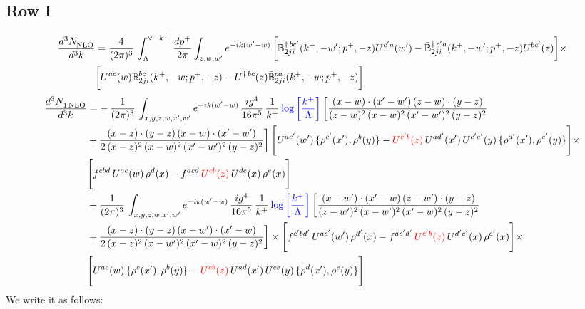 \documentclass[9pt]{article}
\def\mf#1{\mathbb{#1}}
\newcommand{\chg}[1]{{\color{red}#1}}
\numberwithin{equation}{section}
\begin{document}
\subsection{Row I}
\begin{align}
    \frac{d^{3}N_{\rm NLO}^{\rm}}{d^{3}k}  & = \frac{4}{(2\pi)^{3}}\,\int_{\Lambda}^{\vee-k^{+}}\, \frac{dp^{+}}{2\pi}\int_{z,w,w^{\prime}} e^{-ik(w^{\prime}-w)}\, \bigg[\mf{B}^{\dagger\, bc^{\prime}}_{2ji}(k^{+},-w^{\prime};p^{+},-z)U^{ c^{\prime}a}(w^{\prime}) -\Bar{\mf{B}}^{\dagger\, c^{\prime}a}_{2ji}(k^{+},-w^{\prime}; p^{+},-z)U^{bc^{\prime}}(z)\bigg]\times\notag \\ & \bigg[U^{ac}(w) \mf{B}^{bc}_{2ji}(k^{+},-w;p^{+},-z) -U^{\dagger\, bc}(z)\Bar{\mf{B}}^{ca}_{2ji}(k^{+},-w; p^{+},-z)\bigg]\nonumber
\end{align}
\begin{align}
 \frac{d^{3}N_{1\,\rm NLO}^{\rm}}{d^{3}k}  & =   -\, \frac{1}{(2\pi)^{3}}\,\int_{x,y,z,w,x',w^{\prime}} e^{-ik(w^{\prime}-w)}\,\frac{ig^{4}}{16\pi^{5}}\,\frac{1}{k^{+}}\,{\color{blue}\log{\left[\frac{k^{+}}{\Lambda}\right]}}\,\bigg[\frac{(x-w)\cdot (x'-w')\,(z-w)\cdot (y-z)}{(z-w)^{2}\,(x-w)^{2}\,(x'-w')^{2}\,(y-z)^{2}}\notag \\ & +\frac{(x-z)\cdot (y-z)\,(x-w)\cdot (x'-w')}{2\,(x-z)^{2}\, (x-w)^{2}\,(x'-w')^{2}\,(y-z)^{2}}\bigg]\, \Bigg[U^{ac'}(w')\,\{\rho^{c'}(x'),\rho^{b}(y)\}-\chg{U^{c'b}(z)}\,U^{ad'}(x')\,U^{c'e'}(y)\, \{\rho^{d'}(x'),\rho^{e'}(y)\}\Bigg]\times \notag \\ & \Bigg[f^{cbd}\,U^{ac}(w)\,\rho^{d}(x)-f^{acd}\, \chg{U^{cb}(z)}\,U^{de}(x)\,\rho^{e}(x)\Bigg]\notag \\ & + \frac{1}{(2\pi)^{3}}\,\int_{x,y,z,w,x',w^{\prime}} e^{-ik(w^{\prime}-w)}\,\frac{ig^{4}}{16\pi^{5}}\,\frac{1}{k^{+}}\,{\color{blue}\log{\left[\frac{k^{+}}{\Lambda}\right]}}\,\bigg[\frac{(x-w')\cdot (x'-w)\,(z-w')\cdot (y-z)}{(z-w')^{2}\,(x-w')^{2}\,(x'-w)^{2}\,(y-z)^{2}}\notag \\ & +\frac{(x-z)\cdot (y-z)\,(x-w')\cdot (x'-w)}{2\,(x-z)^{2}\, (x-w')^{2}\,(x'-w)^{2}\,(y-z)^{2}}\bigg] \times\Bigg[f^{c'bd'}\,U^{ac'}(w')\,\rho^{d'}(x)-f^{ac'd'}\, \chg{U^{c'b}(z)}\,U^{d'e'}(x)\,\rho^{e'}(x)\Bigg] \times \notag \\ & \Bigg[U^{ac}(w)\,\{\rho^{c}(x'),\rho^{b}(y)\}-\chg{U^{cb}(z)}\,U^{ad}(x')\,U^{ce}(y)\, \{\rho^{d}(x'),\rho^{e}(y)\}\Bigg]
\end{align}
We write it as follows: 
\end{document}
